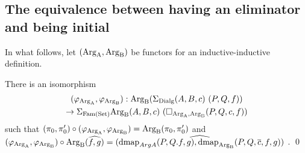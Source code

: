 \documentclass[orivec,envcountsame, ,envcountsect]{llncs}
\begin{document}
\subsection{The equivalence between having an eliminator and being initial}
\label{sec:elim-init-equiv}

In what follows, let $(\text{Arg}_{\text{A}}, \text{Arg}_{\text{B}})$ be functors for an
inductive-inductive definition.

\begin{lemma}
\label{thm:isoArgAB}
  There is an isomorphism
\begin{multline*}
(\varphi_{\text{Arg}_{\text{A}}}, \varphi_{\text{Arg}_{\text{B}}}) : \text{Arg}_{\text{B}}(\Sigma_{\text{Dialg}} (A, B, c)\ (P, Q, f)) \\
  \to \Sigma_{\text{Fam}(\text{Set})} \text{Arg}_{\text{B}}(A, B, c)\ (\Box_{\text{Arg}_{\text{A}}, \text{Arg}_{\text{B}}}(P, Q, c, f)) 
\end{multline*}
such that $(\pi_0, \pi'_0) \circ (\varphi_{\text{Arg}_{\text{A}}}, \varphi_{\text{Arg}_{\text{B}}}) =
\text{Arg}_{\text{B}}(\pi_0, \pi'_0)$ and $(\varphi_{\text{Arg}_{\text{A}}}, \varphi_{\text{Arg}_{\text{B}}}) \circ
\text{Arg}_{\text{B}}(\widehat{f, g}) = \widehat{(\text{dmap}_{ArgA}(P, Q. f, g),
  \text{dmap}_{\text{Arg}_{\text{B}}}(P, Q, \overline{c}, f, g))}$ .  \qed
\end{lemma}
\end{document}

